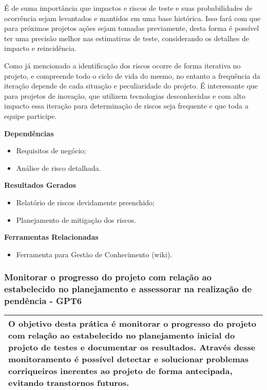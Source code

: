 É de suma importância que impactos e riscos de teste e suas probabilidades de ocorrência sejam levantados e mantidos em uma base histórica. Isso fará com que para próximos projetos ações sejam tomadas previamente, desta forma é possível ter uma precisão melhor nas estimativas de teste, considerando os detalhes de impacto e reincidência.

Como já mencionado a identificação dos riscos ocorre de forma iterativa no projeto, e compreende todo o ciclo de vida do mesmo, no entanto a frequência da iteração depende de cada situação e peculiaridade do projeto. É interessante que para projetos de inovação, que utilizem tecnologias desconhecidas e com alto impacto essa iteração para determinação de riscos seja frequente e que toda a equipe participe.

\textbf{Dependências}
\begin{itemize}
\item Requisitos de negócio;
\item Análise de risco detalhada.
\end{itemize}

\textbf{Resultados Gerados}
\begin{itemize}
\item Relatório de riscos devidamente preenchido;
\item Planejamento de mitigação dos riscos.
\end{itemize}

\textbf{Ferramentas Relacionadas}
\begin{itemize}
    \item Ferramenta para Gestão de Conhecimento (wiki).
\end{itemize}

\subsubsection{Monitorar o progresso do projeto com relação ao estabelecido no planejamento e assessorar na realização de pendência - GPT6}
\label{sec:gpt6}

\begin{table}[!ht]
\centering
\begin{tabular}{|p{130mm}|}
\hline
O objetivo desta prática é monitorar o progresso do projeto com relação ao estabelecido no planejamento inicial do projeto de testes e documentar os resultados. Através desse monitoramento é possível detectar e solucionar problemas corriqueiros inerentes ao projeto de forma antecipada, evitando transtornos futuros. \\ 
\hline
\end{tabular}
\end{table}

